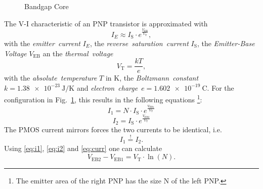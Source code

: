 \documentclass{article}[11pt]
\begin{document}
\notetitle


\cite{widlar-bandgap-71}
\cite{kuijk-bandgap-73}
\cite{brokaw-bandgap-74}
\cite{vittoz-bandgap-79}

\cite{razavi-bandgap-16}
\cite{razavi-bandgap-21}

\cite{rinmora-volref-02}
\cite{ivanov-bandgap-12}
\cite{kok-cmosvoltref-13}
\cite{ma-bandgap-14}
\cite{mohamed-bandgap-19}
\cite{huang-bandgap-21}

\cite{moisello-bandgap-24}
\cite{mangla-amsmosdash-17,vanha-mosizingtool-25}

\begin{figure}[H]
  \centering
  \begin{circuitikz}
    
  \end{circuitikz}
  \caption{Bandgap Core}
  \label{fig:badgap-core}
\end{figure}

The V-I characteristic of an PNP transistor is approximated with
\begin{equation}
 I_E \approx I_{\mathrm{S}} \cdot e^{\frac{V_\mathrm{EB}}{V_\mathrm{T}}},
\end{equation}
with the \textit{emitter~current} $I_E$,
the \textit{reverse~saturation~current} $I_{\mathrm{S}}$, the
\textit{Emitter-Base Voltage} $V_\mathrm{EB}$ an the \textit{thermal~voltage}
\begin{equation}\label{eq:vt}
V_\mathrm{T}=\frac{kT}{e},
\end{equation}
with the \textit{absolute~temperature} $T$ in K,
the \textit{Boltzmann~constant}~$k=\SI{1.38e-23}{\joule\per\kelvin}$
and \textit{electron~charge}~$e=\SI{1.602e-19}{\coulomb}$.
For the configuration in Fig.~\ref{fig:badgap-core}, this results in the
following equations
\footnote{The emitter area of the right PNP has the size N of the left PNP.}:
\begin{equation}\label{eq:i1}
 I_1 = N \cdot I_{\mathrm{S}} \cdot e^{\frac{V_\mathrm{EB1}}{V_\mathrm{T}}}
\end{equation}
\begin{equation}\label{eq:i2}
 I_2 = I_{\mathrm{S}} \cdot e^{\frac{V_\mathrm{EB2}}{V_\mathrm{T}}}
\end{equation}
The PMOS current mirrors forces the two currents to be identical, i.e.
\begin{equation}\label{eq:curr}
 I_1 \stackrel{!}{=} I_2.
\end{equation}
Using \eqref{eq:i1}, \eqref{eq:i2} and \eqref{eq:curr} one can calculate
\begin{equation}
V_\mathrm{EB2}-V_\mathrm{EB1} = V_\mathrm{T} \cdot \ln(N).
\end{equation}
\end{document}
